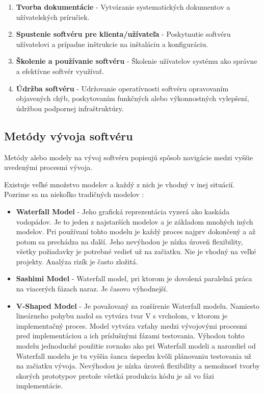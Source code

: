 \documentclass[10pt,twoside,slovak,a4paper]{article}
\begin{document}
\begin{sloppypar}
\begin{enumerate}
\item \textbf{Tvorba dokumentácie} - Vytváranie systematických dokumentov a užívatelských príručiek.
\item \textbf{Spustenie softvéru pre klienta/užívateľa} - Poskytnutie softvéru užívatelovi a prípadne inštrukcie na inštaláciu a konfiguráciu.
\item \textbf{Školenie a používanie softvéru} - Školenie užívatelov systému ako správne a efektívne softvér využívať.
\item \textbf{Údržba softvéru} - Udržovanie operatívnosti softvéru opravovaním objavených chýb, poskytovaním funkčných alebo výkonnostných vylepšení, údržbou podpornej infraštruktúry.
\end{enumerate}
\end{sloppypar}




\subsection{Metódy vývoja softvéru} \label{metody:vyvojSoftveru}
Metódy alebo modely na vývoj softvéru popisujú spôsob navigácie medzi vyššie uvedenými procesmi vývoja.\cite{ModelDef}

Existuje veľké množstvo modelov a každý z nich je vhodný v inej situácií. Pozrime sa na niekoľko tradičných modelov \cite{Methodologies}:
\begin{itemize}
\item \textbf{Waterfall Model} - Jeho grafická reprezentácia vyzerá ako kaskáda vodopádov. Je to jeden z najstarších modelov a je základom mnohých iných modelov. Pri používaní tohto modelu je každý proces najprv dokončený a až potom sa prechádza na ďalší. Jeho nevýhodou je nízka úroveň flexibility, všetky požiadavky je potrebné vedieť už na začiatku. Nie je vhodný na veľké projekty. Analýza rizík je často zložitá.
\item \textbf{Sashimi Model} - Waterfall model, pri ktorom je dovolená paralelná práca na viacerých fázach naraz. Je časovo výhodnejší.
\item \textbf{V-Shaped Model} - Je považovaný za rozšírenie Waterfall modelu. Namiesto lineárneho pohybu nadol sa vytvára tvar V s vrcholom, v ktorom je implementačný proces. Model vytvára vzťahy medzi vývojovými procesmi pred implementáciou a ich príslušnými fázami testovania. Výhodou tohto modelu jednoduché použitie rovnako ako pri Waterfall modeli a narozdiel od Waterfall modelu je tu vyššia šanca úspechu kvôli plánovaniu testovania už na začiatku vývoja. Nevýhodou je nízka úroveň flexibility a nemožnosť tvorby skorých prototypov pretože všetká produkcia kódu je až vo fázi implementácie.
\end{itemize}
\end{document}
